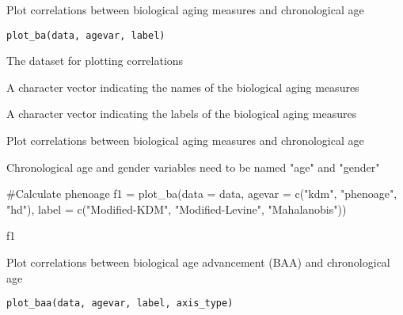 \documentclass[a4paper]{book}
\begin{document}
%
\begin{Description}\relax
Plot correlations between biological aging measures and chronological age
\end{Description}
%
\begin{Usage}
\begin{verbatim}
plot_ba(data, agevar, label)
\end{verbatim}
\end{Usage}
%
\begin{Arguments}
\begin{ldescription}
\item[\code{data}] The dataset for plotting correlations

\item[\code{agevar}] A character vector indicating the names of the biological aging measures

\item[\code{label}] A character vector indicating the labels of the biological aging measures
\end{ldescription}
\end{Arguments}
%
\begin{Details}\relax
Plot correlations between biological aging measures and chronological age
\end{Details}
%
\begin{Note}\relax
Chronological age and gender variables need to be named "age" and "gender"
\end{Note}
%
\begin{Examples}
\begin{ExampleCode}
#Calculate phenoage
f1 = plot_ba(data = data, agevar = c("kdm", "phenoage", "hd"),
             label = c("Modified-KDM\nBiological\nAge",
                       "Modified-Levine\nPhenotypic\nAge",
                       "Mahalanobis\nDistance"))

f1

\end{ExampleCode}
\end{Examples}
%
\begin{Description}\relax
Plot correlations between biological age advancement (BAA) and chronological age
\end{Description}
%
\begin{Usage}
\begin{verbatim}
plot_baa(data, agevar, label, axis_type)
\end{verbatim}
\end{Usage}
\end{document}
